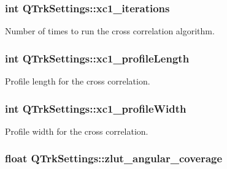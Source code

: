 \subsubsection[{\texorpdfstring{xc1\+\_\+iterations}{xc1_iterations}}]{\setlength{\rightskip}{0pt plus 5cm}int Q\+Trk\+Settings\+::xc1\+\_\+iterations}\hypertarget{struct_q_trk_settings_a0bc4efdffbb8ad272d1c9facfdf0e171}{}\label{struct_q_trk_settings_a0bc4efdffbb8ad272d1c9facfdf0e171}


Number of times to run the cross correlation algorithm. 

\subsubsection[{\texorpdfstring{xc1\+\_\+profile\+Length}{xc1_profileLength}}]{\setlength{\rightskip}{0pt plus 5cm}int Q\+Trk\+Settings\+::xc1\+\_\+profile\+Length}\hypertarget{struct_q_trk_settings_a8f38457c4ec183f78a0191b247ab6b51}{}\label{struct_q_trk_settings_a8f38457c4ec183f78a0191b247ab6b51}


Profile length for the cross correlation. 

\subsubsection[{\texorpdfstring{xc1\+\_\+profile\+Width}{xc1_profileWidth}}]{\setlength{\rightskip}{0pt plus 5cm}int Q\+Trk\+Settings\+::xc1\+\_\+profile\+Width}\hypertarget{struct_q_trk_settings_a80de240523eb79408593d26e6ef07ef7}{}\label{struct_q_trk_settings_a80de240523eb79408593d26e6ef07ef7}


Profile width for the cross correlation. 

\subsubsection[{\texorpdfstring{zlut\+\_\+angular\+\_\+coverage}{zlut_angular_coverage}}]{\setlength{\rightskip}{0pt plus 5cm}float Q\+Trk\+Settings\+::zlut\+\_\+angular\+\_\+coverage}\hypertarget{struct_q_trk_settings_a8892aa193827371fc06ee94254e68b09}{}\label{struct_q_trk_settings_a8892aa193827371fc06ee94254e68b09}


